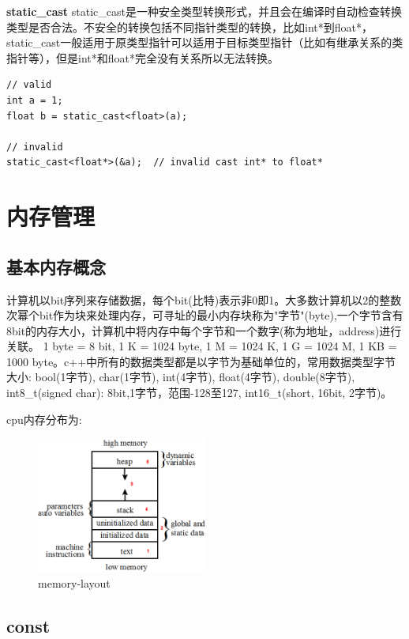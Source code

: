 \documentclass[12pt]{book}
\begin{document}
\textbf{static\_cast} \newline
static\_cast是一种安全类型转换形式，并且会在编译时自动检查转换类型是否合法。不安全的转换包括不同指针类型的转换，比如int*到float*，static\_cast一般适用于原类型指针可以适用于目标类型指针（比如有继承关系的类指针等），但是int*和float*完全没有关系所以无法转换。
\begin{lstlisting}
// valid
int a = 1;
float b = static_cast<float>(a);

// invalid
static_cast<float*>(&a);  // invalid cast int* to float*
\end{lstlisting}

\section{内存管理}
\subsection{基本内存概念}
计算机以bit序列来存储数据，每个bit(比特)表示非0即1。大多数计算机以2的整数次幂个bit作为块来处理内存，可寻址的最小内存块称为"字节"(byte),一个字节含有8bit的内存大小，计算机中将内存中每个字节和一个数字(称为地址，address)进行关联。
1 byte = 8 bit, 1 K = 1024 byte, 1 M = 1024 K, 1 G = 1024 M, 1 KB = 1000 byte。c++中所有的数据类型都是以字节为基础单位的，常用数据类型字节大小: bool(1字节), char(1字节), int(4字节), float(4字节), double(8字节), int8\_t(signed char): 8bit,1字节，范围-128至127, int16\_t(short, 16bit, 2字节)。\newline

cpu内存分布为:
\begin{figure}[H]
\centering
\includegraphics[width=0.5\textwidth]{images/memory_layout.png}
\caption{memory-layout}
\label{memory-layout}
\end{figure}

\subsection{const}
\end{document}

